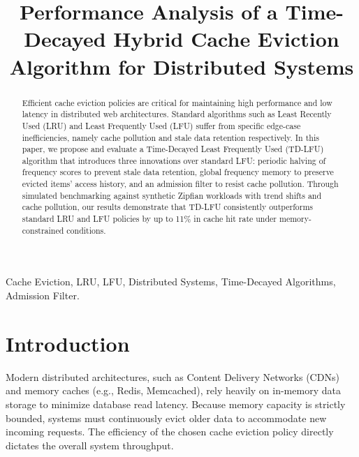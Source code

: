 \documentclass[conference]{IEEEtran}
\begin{document}
\title{Performance Analysis of a Time-Decayed Hybrid Cache Eviction Algorithm for Distributed Systems\\}

\author{
\and
{}
}

\maketitle

\begin{abstract}
Efficient cache eviction policies are critical for maintaining high performance and low latency in distributed web architectures. Standard algorithms such as Least Recently Used (LRU) and Least Frequently Used (LFU) suffer from specific edge-case inefficiencies, namely cache pollution and stale data retention respectively. In this paper, we propose and evaluate a Time-Decayed Least Frequently Used (TD-LFU) algorithm that introduces three innovations over standard LFU: periodic halving of frequency scores to prevent stale data retention, global frequency memory to preserve evicted items' access history, and an admission filter to resist cache pollution. Through simulated benchmarking against synthetic Zipfian workloads with trend shifts and cache pollution, our results demonstrate that TD-LFU consistently outperforms standard LRU and LFU policies by up to 11\% in cache hit rate under memory-constrained conditions.
\end{abstract}

\begin{IEEEkeywords}
Cache Eviction, LRU, LFU, Distributed Systems, Time-Decayed Algorithms, Admission Filter.
\end{IEEEkeywords}

\section{Introduction}
Modern distributed architectures, such as Content Delivery Networks (CDNs) and memory caches (e.g., Redis, Memcached), rely heavily on in-memory data storage to minimize database read latency. Because memory capacity is strictly bounded, systems must continuously evict older data to accommodate new incoming requests. The efficiency of the chosen cache eviction policy directly dictates the overall system throughput.
\end{document}

